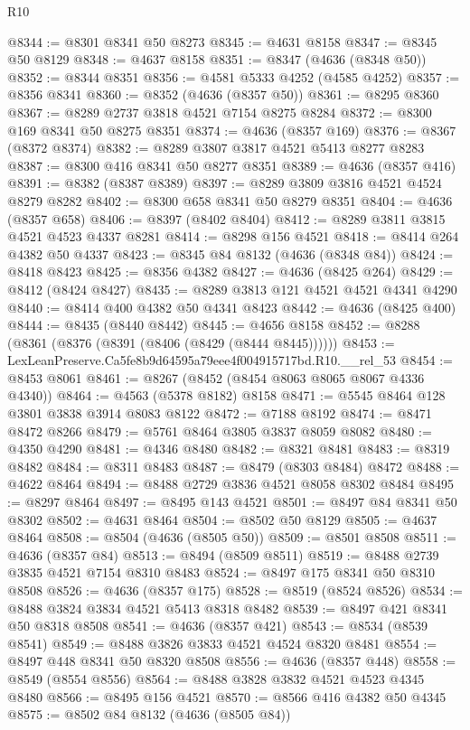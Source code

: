 \begin{lexlean}{R10}
\begin{coremodule}
@8344 := @8301 @8341 @50 @8273
@8345 := @4631 @8158
@8347 := @8345 @50 @8129
@8348 := @4637 @8158
@8351 := @8347 (@4636 (@8348 @50))
@8352 := @8344 @8351
@8356 := @4581 @5333 @4252 (@4585 @4252)
@8357 := @8356 @8341
@8360 := @8352 (@4636 (@8357 @50))
@8361 := @8295 @8360
@8367 := @8289 @2737 @3818 @4521 @7154 @8275 @8284
@8372 := @8300 @169 @8341 @50 @8275 @8351
@8374 := @4636 (@8357 @169)
@8376 := @8367 (@8372 @8374)
@8382 := @8289 @3807 @3817 @4521 @5413 @8277 @8283
@8387 := @8300 @416 @8341 @50 @8277 @8351
@8389 := @4636 (@8357 @416)
@8391 := @8382 (@8387 @8389)
@8397 := @8289 @3809 @3816 @4521 @4524 @8279 @8282
@8402 := @8300 @658 @8341 @50 @8279 @8351
@8404 := @4636 (@8357 @658)
@8406 := @8397 (@8402 @8404)
@8412 := @8289 @3811 @3815 @4521 @4523 @4337 @8281
@8414 := @8298 @156 @4521
@8418 := @8414 @264 @4382 @50 @4337
@8423 := @8345 @84 @8132 (@4636 (@8348 @84))
@8424 := @8418 @8423
@8425 := @8356 @4382
@8427 := @4636 (@8425 @264)
@8429 := @8412 (@8424 @8427)
@8435 := @8289 @3813 @121 @4521 @4521 @4341 @4290
@8440 := @8414 @400 @4382 @50 @4341 @8423
@8442 := @4636 (@8425 @400)
@8444 := @8435 (@8440 @8442)
@8445 := @4656 @8158
@8452 := @8288 (@8361 (@8376 (@8391 (@8406 (@8429 (@8444 @8445))))))
@8453 := LexLeanPreserve.Ca5fe8b9d64595a79eee4f004915717bd.R10.__rel_53
@8454 := @8453 @8061
@8461 := @8267 (@8452 (@8454 @8063 @8065 @8067 @4336 @4340))
@8464 := @4563 (@5378 @8182) @8158
@8471 := @5545 @8464 @128 @3801 @3838 @3914 @8083 @8122
@8472 := @7188 @8192
@8474 := @8471 @8472 @8266
@8479 := @5761 @8464 @3805 @3837 @8059 @8082
@8480 := @4350 @4290
@8481 := @4346 @8480
@8482 := @8321 @8481
@8483 := @8319 @8482
@8484 := @8311 @8483
@8487 := @8479 (@8303 @8484) @8472
@8488 := @4622 @8464
@8494 := @8488 @2729 @3836 @4521 @8058 @8302 @8484
@8495 := @8297 @8464
@8497 := @8495 @143 @4521
@8501 := @8497 @84 @8341 @50 @8302
@8502 := @4631 @8464
@8504 := @8502 @50 @8129
@8505 := @4637 @8464
@8508 := @8504 (@4636 (@8505 @50))
@8509 := @8501 @8508
@8511 := @4636 (@8357 @84)
@8513 := @8494 (@8509 @8511)
@8519 := @8488 @2739 @3835 @4521 @7154 @8310 @8483
@8524 := @8497 @175 @8341 @50 @8310 @8508
@8526 := @4636 (@8357 @175)
@8528 := @8519 (@8524 @8526)
@8534 := @8488 @3824 @3834 @4521 @5413 @8318 @8482
@8539 := @8497 @421 @8341 @50 @8318 @8508
@8541 := @4636 (@8357 @421)
@8543 := @8534 (@8539 @8541)
@8549 := @8488 @3826 @3833 @4521 @4524 @8320 @8481
@8554 := @8497 @448 @8341 @50 @8320 @8508
@8556 := @4636 (@8357 @448)
@8558 := @8549 (@8554 @8556)
@8564 := @8488 @3828 @3832 @4521 @4523 @4345 @8480
@8566 := @8495 @156 @4521
@8570 := @8566 @416 @4382 @50 @4345
@8575 := @8502 @84 @8132 (@4636 (@8505 @84))

\end{coremodule}
\end{lexlean}
